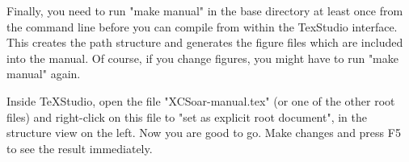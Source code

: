 Finally, you need to run "make manual" in the \xc base directory at least once from the command line before you can compile from within the TexStudio interface. This creates the path structure and generates the figure files which are included into the manual. Of course, if you change figures, you might have to run "make manual" again.

Inside TeXStudio, open the file "XCSoar-manual.tex" (or one of the other root files) and right-click on this file to "set as explicit root document", in the structure view on the left. Now you are good to go. Make changes and press F5 to see the result immediately.
